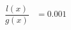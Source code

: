 \documentclass[preview]{standalone}
\begin{document}
\begin{align*}
\dfrac{l(x)}{g(x)} &= 0.001
\end{align*}
\end{document}
